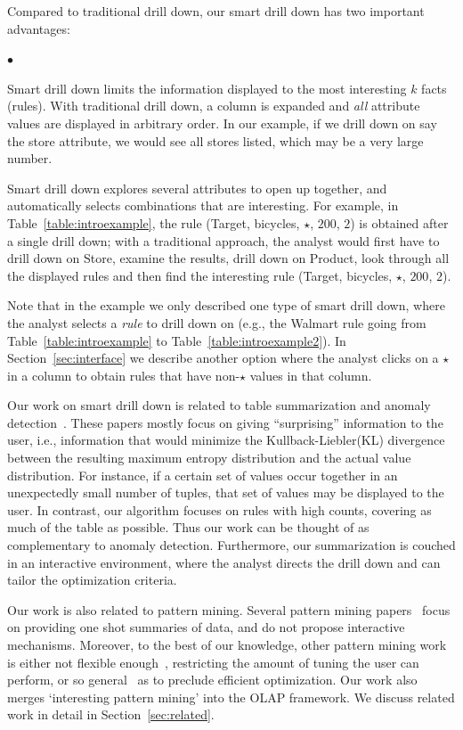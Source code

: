 \documentclass[10pt,journal,compsoc]{IEEEtran}
\newcommand{\squishlist}{
   \begin{list}{$\bullet$}
    { \setlength{\itemsep}{0pt}
      \setlength{\parsep}{2pt}
      \setlength{\topsep}{2pt}
      \setlength{\partopsep}{0pt}
    }
}
\newcommand{\squishend}{\end{list}}
\begin{document}
 Compared to traditional drill down, our smart drill down has two important advantages:
\squishlist
\item
Smart drill down limits the information displayed
to the most interesting $k$ facts (rules).
With traditional drill down, a column is expanded and {\em all}
attribute values are displayed in arbitrary order.
In our example, if we drill down on say the store attribute,
we would see all stores listed, which may be a very large number.
\item
Smart drill down explores several attributes to open up together,
and automatically selects combinations that are interesting.
For example, in Table~\ref{table:introexample},
the rule (Target, bicycles, $\star$, $200$, $2$)
is obtained after a single drill down;
with a traditional approach, the analyst would first have to drill down on
Store, examine the results, drill down on Product,
look through all the displayed rules and then find the interesting rule
(Target, bicycles, $\star$, $200$, $2$).
\squishend

Note that in the example we only described one type of smart drill down,
where the analyst selects a {\em rule} to drill down on
(e.g., the Walmart rule going from Table~\ref{table:introexample} to
Table~\ref{table:introexample2}).
In Section~\ref{sec:interface} we describe another option
where the analyst clicks on a $\star$ in a column to obtain
rules that have non-$\star$ values in that column.

Our work on smart drill down is related
to table summarization and anomaly
detection~\cite{Sarawagi:2001:UMA:767141.767148,
Sarawagi00user-adaptiveexploration,
Sarawagi98discovery-drivenexploration,
DBLP:journals/pvldb/GebalyAGKS14}.
These papers mostly focus on
giving ``surprising'' information to the user, i.e., information
that would minimize the Kullback-Liebler(KL) divergence between the
resulting maximum entropy distribution and the actual value distribution. For instance, if a certain set of
values occur together in an unexpectedly small number of tuples, that
set of values may be displayed to the user. In contrast, our algorithm
focuses on rules with high counts, covering as
much of the table as possible. Thus our work can be thought of as complementary to anomaly detection.
Furthermore, our summarization is couched in
an interactive environment, where the analyst
directs the drill down and can tailor the optimization criteria.

Our work is also related to pattern mining. Several pattern mining papers~\cite{Vreeken:2011:KMI:1969593.1969615,Bringmann:2007:ICDM,Yan:2005:SIP:1081870.1081907} focus on providing one shot summaries of data, and do not propose interactive mechanisms. Moreover, to the best of our knowledge, other pattern mining work is either not flexible enough~\cite{Goethals:2011:MFI:2020408.2020529,Tatti:2014:FRI:2676651.2656261,DeBie:2010:FMI:1816112.1816117}, restricting the amount of tuning the user can perform, or so general~\cite{Leeuwen:2012:DSS:2347179.2347243} as to preclude efficient optimization. Our work also merges `interesting pattern mining' into the OLAP framework. We discuss related work in detail in Section~\ref{sec:related}.
\end{document}
